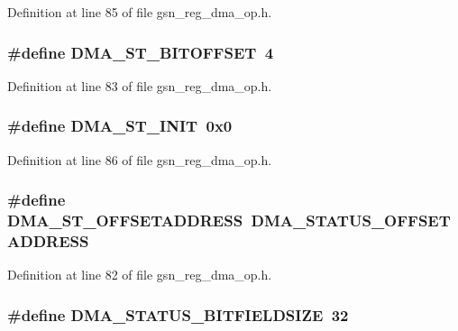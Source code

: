 Definition at line 85 of file gsn\_\-reg\_\-dma\_\-op.h.

\hypertarget{a00547_ab86bc68bfb1dca7b3d90155b4103c3d0}{
\subsubsection[{DMA\_\-ST\_\-BITOFFSET}]{\setlength{\rightskip}{0pt plus 5cm}\#define DMA\_\-ST\_\-BITOFFSET~4}}
\label{a00547_ab86bc68bfb1dca7b3d90155b4103c3d0}


Definition at line 83 of file gsn\_\-reg\_\-dma\_\-op.h.

\hypertarget{a00547_a7225e7cc30263f04e1d64a6e733395e6}{
\subsubsection[{DMA\_\-ST\_\-INIT}]{\setlength{\rightskip}{0pt plus 5cm}\#define DMA\_\-ST\_\-INIT~0x0}}
\label{a00547_a7225e7cc30263f04e1d64a6e733395e6}


Definition at line 86 of file gsn\_\-reg\_\-dma\_\-op.h.

\hypertarget{a00547_ac7e7a79a4c4739fbf9669e6bf96cc4ff}{
\subsubsection[{DMA\_\-ST\_\-OFFSETADDRESS}]{\setlength{\rightskip}{0pt plus 5cm}\#define DMA\_\-ST\_\-OFFSETADDRESS~DMA\_\-STATUS\_\-OFFSETADDRESS}}
\label{a00547_ac7e7a79a4c4739fbf9669e6bf96cc4ff}


Definition at line 82 of file gsn\_\-reg\_\-dma\_\-op.h.

\hypertarget{a00547_ab1c1e1c0c8bc5feb7ea7354fbf782b70}{
\subsubsection[{DMA\_\-STATUS\_\-BITFIELDSIZE}]{\setlength{\rightskip}{0pt plus 5cm}\#define DMA\_\-STATUS\_\-BITFIELDSIZE~32}}
\label{a00547_ab1c1e1c0c8bc5feb7ea7354fbf782b70}


